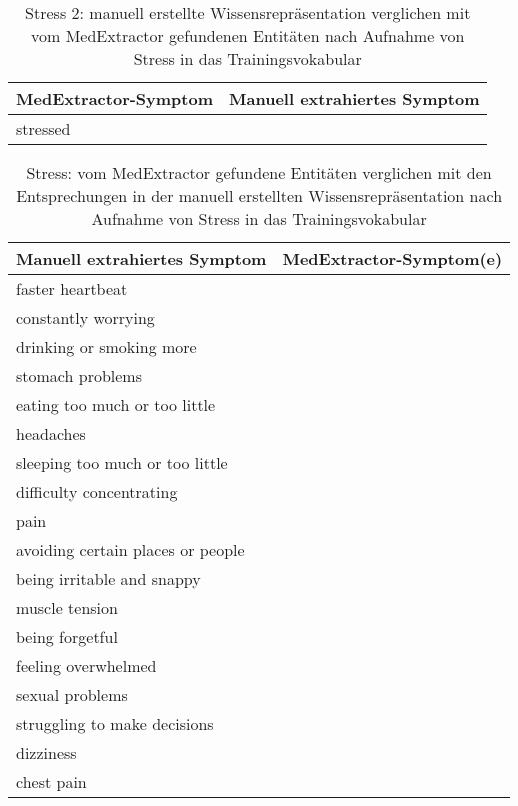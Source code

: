 \begin{table}[H]
\begin{center}
\begin{tabular}{ll}
\toprule
  MedExtractor-Symptom &                       Manuell extrahiertes Symptom \\
\midrule
           stressed &                  \\
\bottomrule
\end{tabular}
\caption{Stress 2: manuell erstellte Wissensrepräsentation verglichen mit vom MedExtractor gefundenen Entitäten nach Aufnahme von Stress in das Trainingsvokabular}
\label{tab:stress_vergleich_manuell_medextractor}
\end{center}
\end{table}


\begin{table}[H]
\begin{center}
\begin{tabular}{ll}
\toprule
                      Manuell extrahiertes Symptom &       MedExtractor-Symptom(e) \\
\midrule
                 faster heartbeat &               \\
              constantly worrying &               \\
         drinking or smoking more &               \\
                 stomach problems &               \\
    eating too much or too little &               \\
                        headaches &               \\
  sleeping too much or too little &               \\
         difficulty concentrating &               \\
                             pain &               \\
avoiding certain places or people &               \\
       being irritable and snappy &               \\
                   muscle tension &               \\
                  being forgetful &               \\
              feeling overwhelmed &               \\
                  sexual problems &               \\
     struggling to make decisions &               \\
                        dizziness &               \\
                       chest pain &               \\
\bottomrule
\end{tabular}
\caption{Stress: vom MedExtractor gefundene Entitäten verglichen mit den Entsprechungen in der manuell erstellten Wissensrepräsentation nach Aufnahme von Stress in das Trainingsvokabular}
\label{tab:stress_medextractor_manuell}
\end{center}
\end{table}


